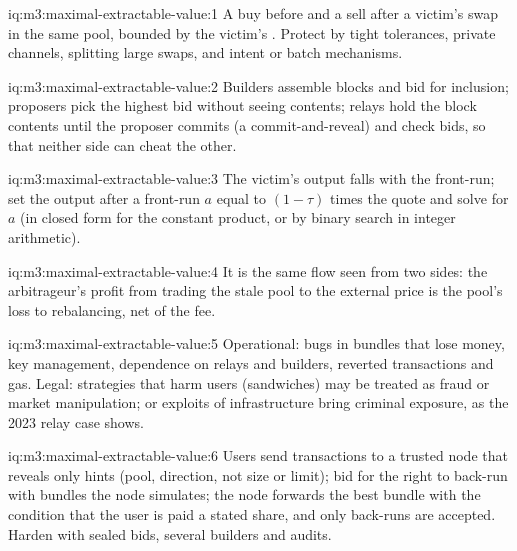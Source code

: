 \begin{solution}{iq:m3:maximal-extractable-value:1}
A buy before and a sell after a victim's swap in the same pool, bounded by the victim's . Protect by tight
tolerances, private channels, splitting large swaps, and intent or batch mechanisms.
\end{solution}

\begin{solution}{iq:m3:maximal-extractable-value:2}
Builders assemble blocks and bid for inclusion; proposers pick the highest bid without seeing contents; relays hold the block
contents until the proposer commits (a commit-and-reveal) and check bids, so that neither side can cheat the other.
\end{solution}

\begin{solution}{iq:m3:maximal-extractable-value:3}
The victim's output falls with the front-run; set the output after a front-run $a$ equal to $(1 - \tau)$ times the quote and
solve for $a$ (in closed form for the constant product, or by binary search in integer arithmetic).
\end{solution}

\begin{solution}{iq:m3:maximal-extractable-value:4}
It is the same flow seen from two sides: the arbitrageur's profit from trading the stale pool to the external price is the pool's
loss to rebalancing, net of the fee.
\end{solution}

\begin{solution}{iq:m3:maximal-extractable-value:5}
Operational: bugs in bundles that lose money, key management, dependence on relays and builders, reverted transactions and gas.
Legal: strategies that harm users (sandwiches) may be treated as fraud or market manipulation;  or exploits of
infrastructure bring criminal exposure, as the 2023 relay case shows.
\end{solution}

\begin{solution}{iq:m3:maximal-extractable-value:6}
Users send transactions to a trusted node that reveals only hints (pool, direction, not size or limit);  bid for the
right to back-run with bundles the node simulates; the node forwards the best bundle with the condition that the user is paid a
stated share, and only back-runs are accepted. Harden with sealed bids, several builders and audits.
\end{solution}
